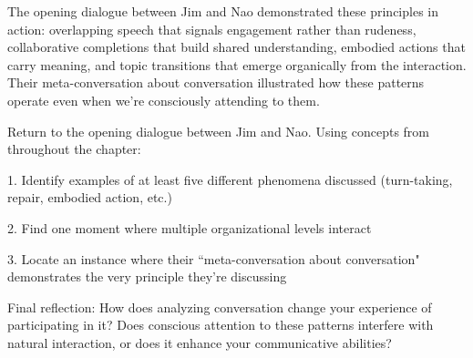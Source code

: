 The opening dialogue between Jim and Nao demonstrated these principles in action: overlapping speech that signals engagement rather than rudeness, collaborative completions that build shared understanding, embodied actions that carry meaning, and topic transitions that emerge organically from the interaction. Their meta-conversation about conversation illustrated how these patterns operate even when we're consciously attending to them.

\begin{tcolorbox}[title=Exercise: Synthesis—Conversation as System, colback=white, colframe=black!75!black, fonttitle=\bfseries]
Return to the opening dialogue between Jim and Nao. Using concepts from throughout the chapter:

1. Identify examples of at least five different phenomena discussed (turn-taking, repair, embodied action, etc.)

2. Find one moment where multiple organizational levels interact

3. Locate an instance where their ``meta-conversation about conversation" demonstrates the very principle they're discussing

Final reflection: How does analyzing conversation change your experience of participating in it? Does conscious attention to these patterns interfere with natural interaction, or does it enhance your communicative abilities?
\end{tcolorbox}

